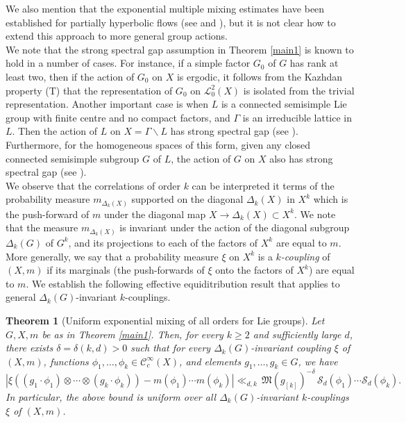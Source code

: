 \documentclass[11pt,reqno,a4paper]{amsart}
\numberwithin{equation}{section}
\newcommand{\cC}{\mathcal{C}}
\newcommand{\cL}{\mathcal{L}}
\newcommand{\cS}{\mathcal{S}}
\theoremstyle{theorem}
\newtheorem{theorem}{Theorem}[section]
\theoremstyle{definition}
\begin{document}
We also mention that the exponential multiple mixing estimates
have been established for 
partially hyperbolic flows (see \cite[Th.~4.4]{hui} and \cite[Th.~2]{dolg}),
but it is not clear how to extend this approach to more general group actions. 
\\

We note that the strong spectral gap assumption in Theorem \ref{main1} is known to hold in a number of cases.
For instance, if a simple factor $G_0$ of $G$ has rank at least two,
then if the action of $G_0$ on $X$ is ergodic, it follows from the Kazhdan property (T) that the representation of $G_0$ on $\cL^2_0(X)$ is isolated from
the trivial representation. Another important case is when $L$ is a connected
semisimple Lie group with finite centre and no compact factors,
and $\Gamma$ is an irreducible lattice in $L$.
Then the action of $L$ on 
$X=\Gamma\backslash L$ has strong spectral gap (see \cite[p.~285]{KSar}).
Furthermore, 
for the homogeneous spaces of this form,
given any closed 
connected semisimple subgroup $G$ of $L$, the action of $G$ on 
$X$ also has strong spectral gap (see \cite{n}).\\

We observe that the correlations of order $k$ can be interpreted 
it terms of the probability measure $m_{\Delta_k(X)}$ 
supported on the diagonal $\Delta_k(X)$ in $X^k$ which is the push-forward of $m$
under the diagonal map $X\to \Delta_k(X)\subset X^k$. We note that the measure $m_{\Delta_k(X)}$ is invariant under the action
of the diagonal subgroup $\Delta_k(G)$ of $G^k$,
and its projections to each of the factors of $X^k$ are equal to $m$.
More generally, we say that a probability measure $\xi$ on $X^k$
is a \emph{$k$-coupling} of $(X,m)$ if its marginals (the push-forwards of $\xi$ onto the factors of $X^k$) are equal to $m$. We establish the following effective equiditribution result that applies to general $\Delta_k(G)$-invariant $k$-couplings.


\begin{theorem}[Uniform exponential mixing of all orders for Lie groups]
	\label{main1_coupl}
	Let $G, X, m$ be as in Theorem \ref{main1}. Then, for every $k \geq 2$ and sufficiently  large $d$,
	there exists $\delta=\delta(k,d)>0$ such that 
	for every $\Delta_{k}(G)$-invariant coupling $\xi$ of $(X,m)$,
	functions $\phi_1,\ldots,\phi_k\in\cC_c^\infty(X)$, and
	elements $g_1,\ldots,g_k \in G$, we have
	\[
	|\xi((g_1\cdot \phi_1)\otimes\cdots \otimes(g_k\cdot \phi_k))-m(\phi_1)\cdots m(\phi_k)|
\ll_{d,k}  \,
	 \mathfrak{M}(g_{[k]})^{-\delta}\, \cS_d(\phi_1)\cdots \cS_d(\phi_k).
	\]
	In particular, the above bound is uniform over all $\Delta_{k}(G)$-invariant $k$-couplings $\xi$ of $(X,m)$.
\end{theorem}
\end{document}
